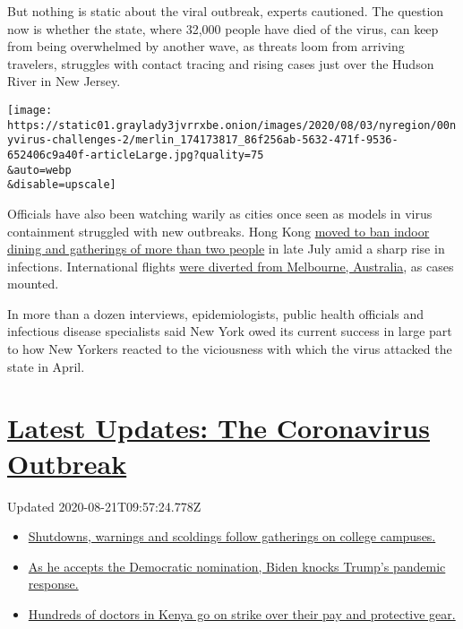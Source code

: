 But nothing is static about the viral outbreak, experts cautioned. The
question now is whether the state, where 32,000 people have died of the
virus, can keep from being overwhelmed by another wave, as threats loom
from arriving travelers, struggles with contact tracing and rising cases
just over the Hudson River in New Jersey.

\texttt{[image: https://static01.graylady3jvrrxbe.onion/images/2020/08/03/nyregion/00nyvirus-challenges-2/merlin\_174173817\_86f256ab-5632-471f-9536-652406c9a40f-articleLarge.jpg?quality=75\\\&auto=webp\\\&disable=upscale]}

Officials have also been watching warily as cities once seen as models
in virus containment struggled with new outbreaks. Hong Kong
\href{https://www.bloomberg.com/news/articles/2020-07-27/hong-kong-to-ban-dining-in-require-masks-outside-cable-tv-says}{moved
to ban indoor dining and gatherings of more than two people} in late
July amid a sharp rise in infections. International flights
\href{https://www.melbourneairport.com.au/Passengers/Passenger-information/COVID-19}{were
diverted from Melbourne, Australia}, as cases mounted.

In more than a dozen interviews, epidemiologists, public health
officials and infectious disease specialists said New York owed its
current success in large part to how New Yorkers reacted to the
viciousness with which the virus attacked the state in April.

\hypertarget{latest-updates-the-coronavirus-outbreak}{%
\section{\texorpdfstring{\href{https://www.nytimes3xbfgragh.onion/2020/08/21/world/covid-19-coronavirus.html?action=click\&pgtype=Article\&state=default\&region=MAIN_CONTENT_1\&context=storylines_live_updates}{Latest
Updates: The Coronavirus
Outbreak}}{Latest Updates: The Coronavirus Outbreak}}\label{latest-updates-the-coronavirus-outbreak}}

Updated 2020-08-21T09:57:24.778Z

\begin{itemize}
\tightlist
\item
  \href{https://www.nytimes3xbfgragh.onion/2020/08/21/world/covid-19-coronavirus.html?action=click\&pgtype=Article\&state=default\&region=MAIN_CONTENT_1\&context=storylines_live_updates\#link-4690b6aa}{Shutdowns,
  warnings and scoldings follow gatherings on college campuses.}
\item
  \href{https://www.nytimes3xbfgragh.onion/2020/08/21/world/covid-19-coronavirus.html?action=click\&pgtype=Article\&state=default\&region=MAIN_CONTENT_1\&context=storylines_live_updates\#link-324af071}{As
  he accepts the Democratic nomination, Biden knocks Trump's pandemic
  response.}
\item
  \href{https://www.nytimes3xbfgragh.onion/2020/08/21/world/covid-19-coronavirus.html?action=click\&pgtype=Article\&state=default\&region=MAIN_CONTENT_1\&context=storylines_live_updates\#link-35890b73}{Hundreds
  of doctors in Kenya go on strike over their pay and protective gear.}
\end{itemize}

